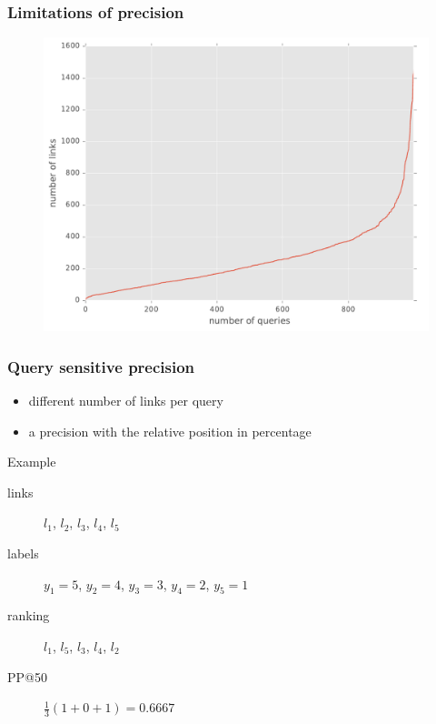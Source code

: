 \begin{frame}
  \frametitle{Limitations of precision}
  \begin{figure}[tbph]
    \centering
    \includegraphics[width=0.95\linewidth]{images/limits_of_precision}
  \end{figure}
\end{frame}

\begin{frame}
  \frametitle{Query sensitive precision}
  \begin{itemize}
    \item different number of links per query
    \item a precision with the relative position in percentage
  \end{itemize}
  \begin{exampleblock}{Example}
    \begin{description}
      \item[links] $l_1$, $l_2$, $l_3$, $l_4$, $l_5$
      \item[labels] $y_1=5$, $y_2=4$, $y_3=3$, $y_4=2$, $y_5=1$\\
      \item[ranking] $l_1$, $l_5$, $l_3$, $l_4$, $l_2$
      \item[PP@50] $\frac{1}{3} (1 + 0 + 1) = 0.6667$
    \end{description}
  \end{exampleblock}
\end{frame}

